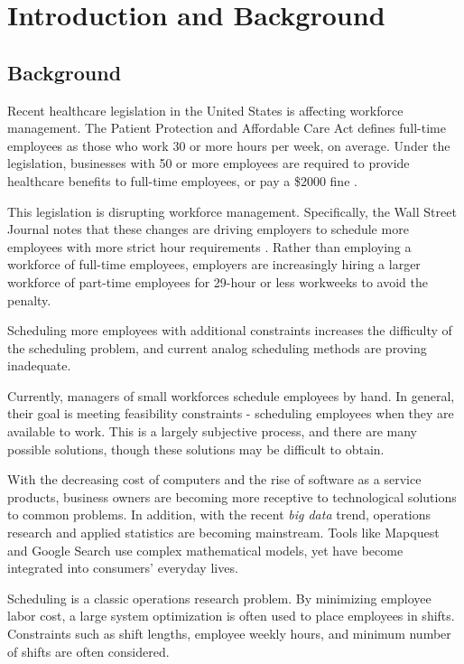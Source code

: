 \chapter{Introduction and Background}

\section{Background}
Recent healthcare legislation in the United States is affecting workforce management. The Patient Protection and Affordable Care Act defines full-time employees as those who work 30 or more hours per week, on average. Under the legislation, businesses with 50 or more employees are required to provide healthcare benefits to full-time employees, or pay a \$2000 fine \cite{ppaca}. 

This legislation is disrupting workforce management. Specifically, the Wall Street Journal  notes that these changes are driving employers to schedule more employees with more strict hour requirements \cite{wsj}. Rather than employing a workforce of full-time employees, employers are increasingly hiring a larger workforce of part-time employees for 29-hour or less workweeks to avoid the penalty. 

Scheduling more employees with additional constraints increases the difficulty of the scheduling problem, and current analog scheduling methods are proving inadequate.

Currently, managers of small workforces schedule employees by hand. In general, their goal is meeting feasibility constraints - scheduling employees when they are available to work. This is a largely subjective process, and there are many possible solutions, though these solutions may be difficult to obtain.

With the decreasing cost of computers and the rise of software as a service products, business owners are becoming more receptive to technological solutions to common problems. In addition, with the recent \emph{big data} trend, operations research and applied statistics are becoming mainstream. Tools like Mapquest and Google Search use  complex mathematical models, yet have become integrated into consumers' everyday lives.

Scheduling is a classic operations research problem. By minimizing employee labor cost, a large system optimization is often used to place employees in shifts. Constraints such as shift lengths, employee weekly hours, and minimum number of shifts are often considered. 

